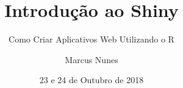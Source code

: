 \documentclass[12pt, compress, usetitleprogressbar]{beamer}\usepackage[]{graphicx}\usepackage[]{color}
\title{Introdução ao Shiny}
\subtitle{Como Criar Aplicativos Web Utilizando o R}
\date{23 e 24 de Outubro de 2018}
\author{Marcus Nunes}
\institute{Universidade Federal do Rio Grande do Norte}
\begin{document}

\newcommand{\alphahat}{\widehat{\alpha}}
\newcommand{\amostra}{x_1, x_2, \cdots, x_n}
\newcommand{\Amostra}{X_1, X_2, \cdots, X_n}
\newcommand{\AmostraY}{Y_1, Y_2, \cdots, Y_m}
\newcommand{\AmostraYn}{Y_1, Y_2, \cdots, Y_n}
\newcommand{\Bin}{\mbox{Bin}}
\newcommand{\Dbar}{\overline{D}}
\newcommand{\dbar}{\overline{d}}
\newcommand{\E}{E}
\newcommand{\EP}{\mbox{EP}}
\newcommand{\EPe}{\widehat{\mbox{EP}}}
\newcommand{\EQM}{\mbox{EQM}}
\newcommand{\EMV}{\mbox{EMV}}
\newcommand{\ErroPadrao}{\mbox{Erro Padrão}}
\newcommand{\Estimativa}{\mbox{Estimativa}}
\newcommand{\Exp}{\mbox{Exp}}
\newcommand{\IC}{\mbox{IC}}
\newcommand{\integral}{\int_{-\infty}^{\infty}}
\newcommand{\LL}{\mathcal{L}}
\newcommand{\limite}{\lim_{n \rightarrow \infty}}
\newcommand{\Med}{\mbox{Med}}
\newcommand{\Multiplicador}{\mbox{Multiplicador}}
\newcommand{\p}{\widehat{p}}
\newcommand{\parametros}{\theta_1, \cdots, \theta_r}
\newcommand{\parametroshat}{\widehat{\theta_1}, \cdots, \widehat{\theta_r}}
\newcommand{\R}{\mathbb{R}}
\newcommand{\sigmahat}{\widehat{\sigma}}
\newcommand{\specialcell}[2][t]{%
  \begin{tabular}[#1]{@{}c@{}}#2\end{tabular}}
\newcommand{\soma}{X_1 + X_2 + \cdots + X_n}
\newcommand{\soman}{\sum_{i=1}^n}
\newcommand{\talpha}{t_{(gl; \alpha/2)}}
\newcommand{\thetahat}{\widehat{\theta}}
\newcommand{\Unif}{\mbox{Unif}}
\newcommand{\Var}{\mbox{Var}}
\newcommand{\Weibull}{\mbox{Weibull}}
\newcommand{\Xb}{\bm{X}}
\newcommand{\xb}{\bm{x}}
\newcommand{\Xbar}{\overline{X}}
\newcommand{\XbarCum}{\overline{X}_{c_1}}
\newcommand{\XbarCdois}{\overline{X}_{c_2}}
\newcommand{\xbar}{\overline{x}}
\newcommand{\Yb}{\bm{Y}}
\newcommand{\Ybar}{\overline{Y}}
\newcommand{\Yhat}{\widehat{Y}}
\newcommand{\zalpha}{z_{\alpha/2}}
\newcommand{\Zbarra}{\overline{Z}}
\newcommand{\zg}{z_{\gamma}}














\maketitle
\end{document}
